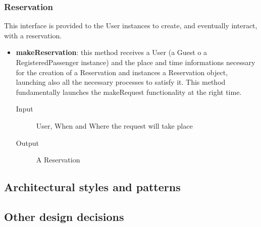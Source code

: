 		\subsubsection{Reservation}
		This interface is provided to the User instances to create, and eventually interact, with a reservation.
		\begin{itemize}
			\item \textbf{makeReservation}: this method receives a User (a Guest o a RegisteredPassenger instance)
			and the place and time informations necessary for the creation of a Reservation and instances a
			Reservation object, launching also all the necessary processes to satisfy it. This method fundamentally
			launches the makeRequest functionality at the right time.
			\begin{description}
				\item[Input] User, When and Where the request will take place
				\item[Output] A Reservation
			\end{description}
		\end{itemize}
	\subsection{Architectural styles and patterns}
	\subsection{Other design decisions}